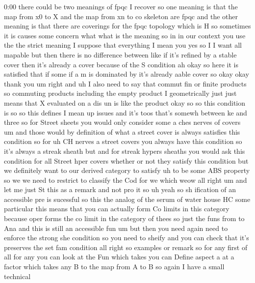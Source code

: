 \begin{unfinished}{0:00}
there  could  be  two  meanings  of  fpqc  I
recover  so  one  meaning  is  that  the  map
from  x0  to  X  and  the  map  from  xn  to  co
skeleton  are
fpqc  and  the  other  meaning  is  that  there
are  coverings  for  the  fpqc  topology
which  is  H  so  sometimes  it  is  causes
some  concern  what  what  is  the  meaning  so
in  in  our  context  you  use  the  the  strict
meaning  I  suppose  that  everything  I  mean
you  yes  so  I  I  want  all  mapable  but  then
there  is  no  difference  between  like  if
it's  refined  by  a  stable  cover  then  it's
already  a  cover  because  of  the  S
condition  ah  okay  so  here  it  is
satisfied  that  if  some  if  a  m  is
dominated
by  it's  already  aable  cover  so  okay  okay
thank
you  um  right  and
uh  I  also  need  to  say  that  commut  fin  or
finite  products  so  commuting  products
including  the  empty
product  I  geometrically  just  just  means
that  X  evaluated  on  a  dis  un  is  like  the
product
okay
so  so  this  condition  is  so  so  this
defines  I  mean  up
issues  and  it's
toos  that's  somewh
between
ke  and
three
so  for  Street  sheets  you  would  only
consider  some  a  ches  nerves  of  covers  um
and  those  would  by  definition  of  what  a
street  cover  is  always  satisfies  this
condition  so  for  uh  CH  nerves  a  street
covers  you  always  have  this  condition  so
it's  always  a  streak
sheath  but  and  for  streak  hypers  sheaths
you  would  ask  this  condition  for  all
Street  hper  covers  whether  or  not  they
satisfy  this  condition  but  we  definitely
want  to  our  derived  category  to  satisfy
uh  to  be
some  ABS  property  so  we  we  need  to
restrict  to  classify  the  Cod  for  we
which
weow  all  right
um
and  let  me  just  St  this  as  a  remark
and  not  pro  it  so
uh  yeah  so  sh
ification  of  an  accessible  pre  is
sucessful  so  this  the  analog  of  the
serum  of  water  house
HC  some  particular  this  means  that  you
can  actually  form  Co  limits  in  this
category  because  oper  forms  the  co  limit
in  the  category  of  thees  so  just  the
funs  from  to
Ana
and  this  is  still  an  accessible  fun  um
but  then  you  need  again  need  to  enforce
the  strong  she  condition  so  you  need  to
sheify  and  you  can  check  that  it's
preserves  the  set  fam
condition  all  right
so
examples  or
remark  so  for  any  first  of  all  for
any  you  can  look  at  the  Fun  which
takes
you  can  Define  aspect  a  at  a  factor
which  takes  any  B  to  the  map  from  A  to
B  so  again  I  have  a  small  technical

\end{unfinished}
